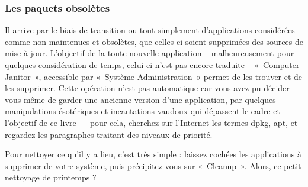 {\subsubsection{Les paquets obsolètes}
\label{RefCleaner}
Il arrive par le biais de transition ou tout simplement d'applications considérées comme non maintenues et obsolètes, que celles-ci soient supprimées des sources de mise à jour. L'objectif de la toute nouvelle application -- malheureusement pour quelques considération de temps, celui-ci n'est pas encore traduite -- «~Computer Janitor~», accessible par «~Système \FlecheDroite Administration~» permet de les trouver et de les supprimer. Cette opération n'est pas automatique car vous avez pu décider vous-même de garder une ancienne version d'une application, par quelques manipulations ésotériques et incantations vaudoux qui dépassent le cadre et l'objectif de ce livre --- pour cela, cherchez sur l'Internet les termes dpkg, apt, et regardez les paragraphes traitant des niveaux de priorité.\par
Pour nettoyer ce qu'il y a lieu, c'est très simple : laissez cochées les applications à supprimer de votre système, puis précipitez vous sur «~Cleanup~». Alors, ce petit nettoyage de printemps ?
}
